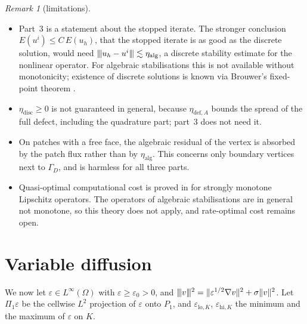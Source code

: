 \documentclass[11pt]{article}
\newcommand{\tnorm}[1]{\lvert\kern-0.25ex\lvert\kern-0.25ex\lvert #1\rvert\kern-0.25ex\rvert\kern-0.25ex\rvert}
\newcommand{\eps}{\varepsilon}
\newcommand{\defe}{\mathrm{def}}
\theoremstyle{plain}
\theoremstyle{remark}
\newtheorem{remark}[theorem]{Remark}
\numberwithin{equation}{section}
\begin{document}
\begin{remark}[limitations]
\leavevmode
\begin{itemize}
  \item Part~3 is a statement about the stopped iterate. The stronger conclusion
  $E(u^i)\le C\,E(u_h)$, that the stopped iterate is as good as the discrete solution, would need
  $\tnorm{u_h-u^i}\lesssim\eta_{\mathrm{alg}}$, a discrete stability estimate for the nonlinear
  operator. For algebraic stabilisations this is not available without monotonicity; existence of
  discrete solutions is known via Brouwer's fixed-point theorem \cite{BJK16}.
  \item $\eta_{\mathrm{disc}}\ge0$ is not guaranteed in general, because $\eta_{\defe,A}$ bounds the
  spread of the full defect, including the quadrature part; part~3 does not need it.
  \item On patches with a free face, the algebraic residual of the vertex is absorbed by the patch
  flux rather than by $\eta_{\mathrm{alg}}$. This concerns only boundary vertices next to $\Gamma_D$,
  and is harmless for all three parts.
  \item Quasi-optimal computational cost is proved in \cite{HPSV21} for strongly monotone Lipschitz
  operators. The operators of algebraic stabilisations are in general not monotone, so this theory
  does not apply, and rate-optimal cost remains open.
\end{itemize}
\end{remark}

\section{Variable diffusion}\label{sec:vareps}

We now let $\eps\in L^\infty(\Omega)$ with $\eps\ge\eps_0>0$, and
$\tnorm{v}^2=\|\eps^{1/2}\nabla v\|^2+\sigma\|v\|^2$. Let $\Pi_1\eps$ be the cellwise $L^2$
projection of $\eps$ onto $P_1$, and $\eps_{\mathrm{lo},K}$, $\eps_{\mathrm{hi},K}$ the minimum and the
maximum of $\eps$ on $K$.
\end{document}

